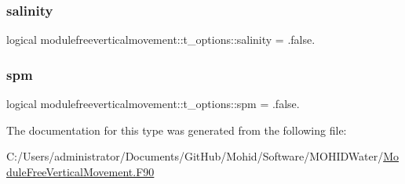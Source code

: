 \subsubsection{\texorpdfstring{salinity}{salinity}}
{\footnotesize\ttfamily logical modulefreeverticalmovement\+::t\+\_\+options\+::salinity = .false.\hspace{0.3cm}{\ttfamily [private]}}

\mbox{\label{structmodulefreeverticalmovement_1_1t__options_a5ada6c40c416f437d36767f32042db28}} 
\subsubsection{\texorpdfstring{spm}{spm}}
{\footnotesize\ttfamily logical modulefreeverticalmovement\+::t\+\_\+options\+::spm = .false.\hspace{0.3cm}{\ttfamily [private]}}



The documentation for this type was generated from the following file\+:\begin{DoxyCompactItemize}
\item 
C\+:/\+Users/administrator/\+Documents/\+Git\+Hub/\+Mohid/\+Software/\+M\+O\+H\+I\+D\+Water/\mbox{\hyperlink{_module_free_vertical_movement_8_f90}{Module\+Free\+Vertical\+Movement.\+F90}}\end{DoxyCompactItemize}
